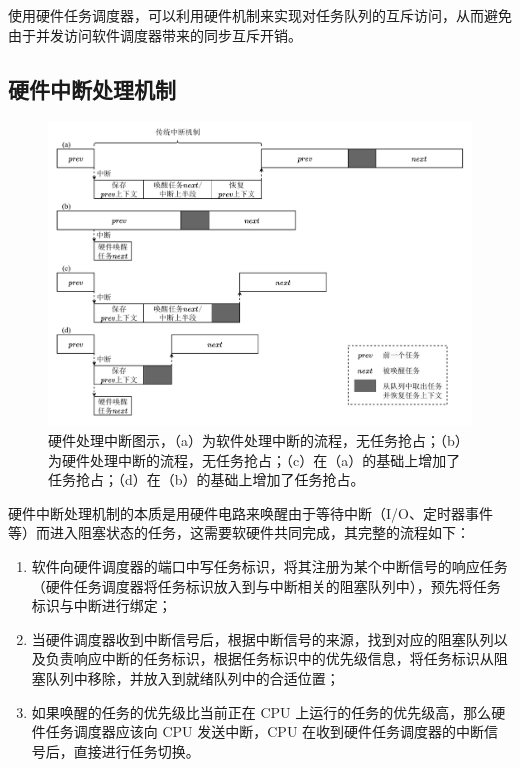 使用硬件任务调度器，可以利用硬件机制来实现对任务队列的互斥访问，从而避免由于并发访问软件调度器带来的同步互斥开销。

\subsection{硬件中断处理机制}

\begin{figure}[htbp]
    \centering
    \includegraphics[width=\textwidth]{figures/pdfs/intr_demo.pdf}
    \caption{硬件处理中断图示，（a）为软件处理中断的流程，无任务抢占；（b）为硬件处理中断的流程，无任务抢占；（c）在（a）的基础上增加了任务抢占；（d）在（b）的基础上增加了任务抢占。}
    \label{figure:intr_demo}
\end{figure}

硬件中断处理机制的本质是用硬件电路来唤醒由于等待中断（I/O、定时器事件等）而进入阻塞状态的任务，这需要软硬件共同完成，其完整的流程如下：

\begin{enumerate}
    \item 软件向硬件调度器的端口中写任务标识，将其注册为某个中断信号的响应任务（硬件任务调度器将任务标识放入到与中断相关的阻塞队列中），预先将任务标识与中断进行绑定；
    \item 当硬件调度器收到中断信号后，根据中断信号的来源，找到对应的阻塞队列以及负责响应中断的任务标识，根据任务标识中的优先级信息，将任务标识从阻塞队列中移除，并放入到就绪队列中的合适位置；
    \item 如果唤醒的任务的优先级比当前正在 CPU 上运行的任务的优先级高，那么硬件任务调度器应该向 CPU 发送中断，CPU 在收到硬件任务调度器的中断信号后，直接进行任务切换。
\end{enumerate}

